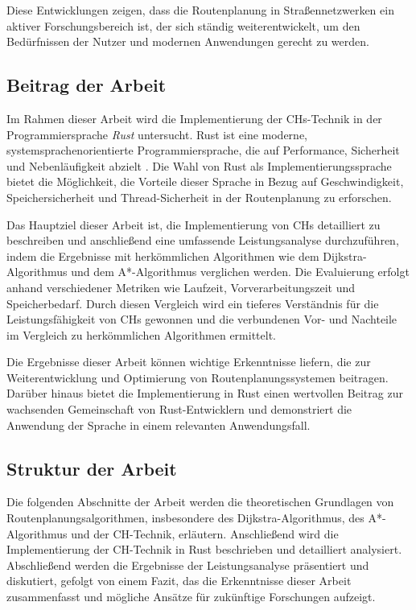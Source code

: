 Diese Entwicklungen zeigen, dass die Routenplanung in Straßennetzwerken
ein aktiver Forschungsbereich ist, der sich ständig weiterentwickelt, um den Bedürfnissen der Nutzer
und modernen Anwendungen gerecht zu werden.

\subsection{Beitrag der Arbeit}
Im Rahmen dieser Arbeit wird die Implementierung der \ac{CHs}-Technik in der Programmiersprache
\emph{Rust} untersucht. Rust ist eine moderne, systemsprachenorientierte Programmiersprache, die auf
Performance, Sicherheit und Nebenläufigkeit abzielt \cite{rust.book}. Die Wahl von Rust als
Implementierungssprache bietet die Möglichkeit, die Vorteile dieser Sprache in Bezug auf
Geschwindigkeit, Speichersicherheit und Thread-Sicherheit in der Routenplanung zu erforschen.

Das Hauptziel dieser Arbeit ist, die Implementierung von \ac{CHs} detailliert zu beschreiben und
anschließend eine umfassende Leistungsanalyse durchzuführen, indem die Ergebnisse mit herkömmlichen
Algorithmen wie dem Dijkstra-Algorithmus und dem A*-Algorithmus verglichen werden. Die Evaluierung
erfolgt anhand verschiedener Metriken wie Laufzeit, Vorverarbeitungszeit und Speicherbedarf.
Durch diesen Vergleich wird ein tieferes Verständnis für die Leistungsfähigkeit von \ac{CHs}
gewonnen und die verbundenen Vor- und Nachteile im Vergleich zu herkömmlichen Algorithmen ermittelt.

Die Ergebnisse dieser Arbeit können wichtige Erkenntnisse liefern, die zur
Weiterentwicklung und Optimierung von Routenplanungssystemen beitragen. Darüber
hinaus bietet die Implementierung in Rust einen wertvollen Beitrag zur
wachsenden Gemeinschaft von Rust-Entwicklern und demonstriert die Anwendung der
Sprache in einem relevanten Anwendungsfall.

\subsection{Struktur der Arbeit}
Die folgenden Abschnitte der Arbeit werden die theoretischen Grundlagen von
Routenplanungsalgorithmen, insbesondere des Dijkstra-Algorithmus, des A*-Algorithmus
und der CH-Technik, erläutern. Anschließend wird die Implementierung der CH-Technik in
Rust beschrieben und detailliert analysiert. Abschließend werden die Ergebnisse der
Leistungsanalyse präsentiert und diskutiert, gefolgt von einem Fazit, das die Erkenntnisse
dieser Arbeit zusammenfasst und mögliche Ansätze für zukünftige Forschungen aufzeigt.
